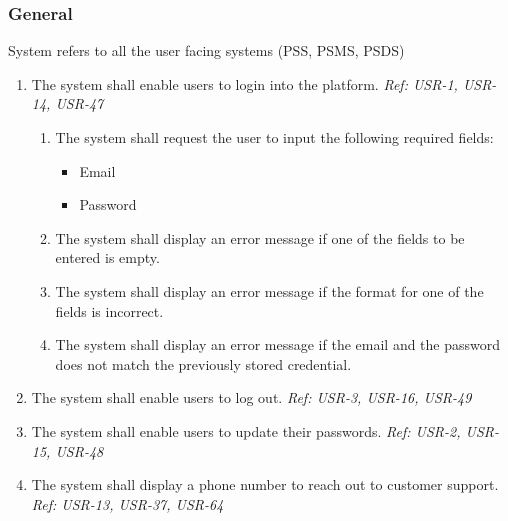\subsubsection{General}
System refers to all the user facing systems (PSS, PSMS, PSDS)
\begin{enumerate}[label=SY-\arabic*]
    \item The system shall enable users to login into the platform. 
    \newline \textit{Ref: USR-1, USR-14, USR-47}
    \begin{enumerate}[label=SY-1.\arabic*]
        \item The system shall request the user to input the following required 
        fields:
        \begin{itemize}
            \item Email
            \item Password
        \end{itemize}
        \item The system shall display an error message if one of the fields 
        to be entered is empty.
        \item The system shall display an error message if the format for one 
        of the fields is incorrect.
        \item The system shall display an error message if the email and 
        the password does not match the previously stored credential.
    \end{enumerate}
    \item The system shall enable users to log out. 
    \newline \textit{Ref: USR-3, USR-16, USR-49}
    \item The system shall enable users to update their passwords.
    \newline \textit{Ref: USR-2, USR-15, USR-48}
    \item The system shall display a phone number to reach out to customer 
    support. 
    \newline \textit{Ref: USR-13, USR-37, USR-64}
\end{enumerate}
\pagebreak
